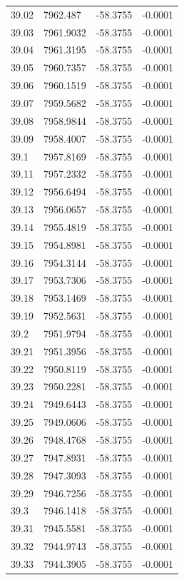 \begin{table}[H]
\begin{tabular}{llll}
39.02 & 7962.487 & -58.3755 & -0.0001 \\
39.03 & 7961.9032 & -58.3755 & -0.0001 \\
39.04 & 7961.3195 & -58.3755 & -0.0001 \\
39.05 & 7960.7357 & -58.3755 & -0.0001 \\
39.06 & 7960.1519 & -58.3755 & -0.0001 \\
39.07 & 7959.5682 & -58.3755 & -0.0001 \\
39.08 & 7958.9844 & -58.3755 & -0.0001 \\
39.09 & 7958.4007 & -58.3755 & -0.0001 \\
39.1 & 7957.8169 & -58.3755 & -0.0001 \\
39.11 & 7957.2332 & -58.3755 & -0.0001 \\
39.12 & 7956.6494 & -58.3755 & -0.0001 \\
39.13 & 7956.0657 & -58.3755 & -0.0001 \\
39.14 & 7955.4819 & -58.3755 & -0.0001 \\
39.15 & 7954.8981 & -58.3755 & -0.0001 \\
39.16 & 7954.3144 & -58.3755 & -0.0001 \\
39.17 & 7953.7306 & -58.3755 & -0.0001 \\
39.18 & 7953.1469 & -58.3755 & -0.0001 \\
39.19 & 7952.5631 & -58.3755 & -0.0001 \\
39.2 & 7951.9794 & -58.3755 & -0.0001 \\
39.21 & 7951.3956 & -58.3755 & -0.0001 \\
39.22 & 7950.8119 & -58.3755 & -0.0001 \\
39.23 & 7950.2281 & -58.3755 & -0.0001 \\
39.24 & 7949.6443 & -58.3755 & -0.0001 \\
39.25 & 7949.0606 & -58.3755 & -0.0001 \\
39.26 & 7948.4768 & -58.3755 & -0.0001 \\
39.27 & 7947.8931 & -58.3755 & -0.0001 \\
39.28 & 7947.3093 & -58.3755 & -0.0001 \\
39.29 & 7946.7256 & -58.3755 & -0.0001 \\
39.3 & 7946.1418 & -58.3755 & -0.0001 \\
39.31 & 7945.5581 & -58.3755 & -0.0001 \\
39.32 & 7944.9743 & -58.3755 & -0.0001 \\
39.33 & 7944.3905 & -58.3755 & -0.0001 \\

\end{tabular}
\end{table}
